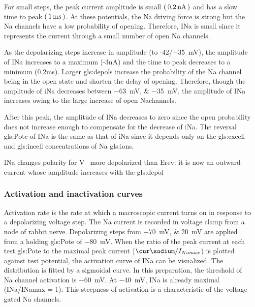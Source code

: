 \documentclass[class={.NoTouch/myProject}, crop=false]{standalone}
\begin{document}
For small steps, the peak current amplitude is small \(\br{\qty{0.2}{\nano\ampere}}\) and has a slow time to peak \(\br{\qty{1}{\milli\second}}\). At these potentials, the \gls{Na} driving force is strong but the \gls{Na} channels have a low probability of opening. Therefore, INa is small since it represents the current through a small number of open \gls{Na} channels. 

As the depolarizing steps increase in amplitude (to -42/\qty{-35}{\mV}), the amplitude of INa increases to a maximum (-3nA) and the time to peak decreases to a minimum (0.2ms). Larger \glspl{gls:depol} increase the probability of the \gls{Na} channel being in the open state and shorten the delay of opening. Therefore, though the amplitude of iNa decreases between \qtylist{-63;-35}{\mV}, the amplitude of INa increases owing to the large increase of open \gls{Na}channels. 

After this peak, the amplitude of INa decreases to zero since the open probability does not increase enough to compensate for the decrease of iNa. The reversal \gls{gls:Pote} of INa is the same as that of iNa since it depends only on the \gls{gls:excell} and \gls{gls:incell} concentrations of \gls{Na} \glspl{gls:ion}.

INa changes polarity for \unit{\V\membrane} more depolarized than Erev: it is now an outward current whose amplitude increases with the \gls{gls:depol} 

\subsubsection{Activation and inactivation curves }
Activation rate is the rate at which a macroscopic current turns on in response to a depolarizing voltage step. The \gls{Na} current is recorded in voltage clamp from a node of rabbit nerve. Depolarizing steps from \qtylist{-70;20}{\mV} are applied from a holding \gls{gls:Pote} of \qty{-80}{\mV}. When the ratio of the peak current at each test \gls{gls:Pote} to the maximal peak current (\(\unit{\cur\sodium}/I_{Namax}\)) is plotted against test potential, the activation curve of INa can be visualized. The distribution is fitted by a sigmoidal curve. In this preparation, the threshold of \gls{Na} channel activation is \qty{-60}{\mV}. At \qty{-40}{\mV}, INa is already maximal (INa/INamax = 1). This steepness of activation is a characteristic of the voltage-gated \gls{Na} channels. 
\end{document}

